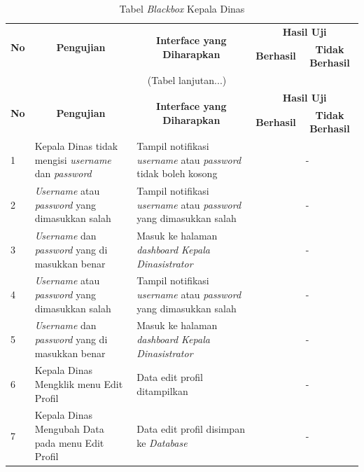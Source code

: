 \begin{enumerate}
{		\begin{longtable}{p{0.5cm} p{4cm} p{5cm} p{0.5cm} p{1cm}}
			\caption{Tabel \textit{Blackbox} Kepala Dinas}
			\label{blackboxtesting2}\\ 
			\hline
			\multicolumn{1}{c}{\multirow{2}{*}{\textbf{No}}} & \multicolumn{1}{c}{\multirow{2}{*}{\textbf{Pengujian}}} & \multicolumn{1}{c}{\multirow{2}{*}{\textbf{Interface yang Diharapkan}}} & \multicolumn{2}{c}{\textbf{Hasil Uji}} \\ \cline{4-5} 
			\multicolumn{1}{c}{} & \multicolumn{1}{c}{} & \multicolumn{1}{c}{} & \multicolumn{1}{c}{\textbf{Berhasil}} & \multicolumn{1}{c}{\textbf{Tidak Berhasil}} \\ \hline
			\endfirsthead
			\multicolumn{5}{c}{\tablename\ \thetable\ \namaTabel \space (Tabel
				lanjutan...)} \\
			\hline
			\multicolumn{1}{c}{\multirow{2}{*}{\textbf{No}}} & \multicolumn{1}{c}{\multirow{2}{*}{\textbf{Pengujian}}} & \multicolumn{1}{c}{\multirow{2}{*}{\textbf{Interface yang Diharapkan}}} & \multicolumn{2}{c}{\textbf{Hasil Uji}} \\ \cline{4-5} 
			\multicolumn{1}{c}{} & \multicolumn{1}{c}{} & \multicolumn{1}{c}{} & \multicolumn{1}{c}{\textbf{Berhasil}} & \multicolumn{1}{c}{\textbf{Tidak Berhasil}} \\ \hline
			\endhead
			1 & Kepala Dinas tidak mengisi \textit{username} dan \textit{password} & Tampil notifikasi \textit{username} atau \textit{password} tidak boleh kosong & \checkmark & -\\
			2 & \textit{Username} atau \textit{password} yang dimasukkan salah & Tampil notifikasi \textit{username} atau \textit{password} yang dimasukkan salah & \checkmark & -\\
			3 & \textit{Username} dan \textit{password} yang di masukkan benar & Masuk ke halaman \textit{dashboard Kepala Dinasistrator} & \checkmark & -\\
			4 & \textit{Username} atau \textit{password} yang dimasukkan salah & Tampil notifikasi \textit{username} atau \textit{password} yang dimasukkan salah & \checkmark & -\\
			5 & \textit{Username} dan \textit{password} yang di masukkan benar & Masuk ke halaman \textit{dashboard Kepala Dinasistrator} & \checkmark & -\\
			6 & Kepala Dinas Mengklik menu Edit Profil  & Data edit profil ditampilkan & \checkmark & -\\
			7 & Kepala Dinas Mengubah Data pada  menu Edit Profil  & Data edit profil disimpan ke \textit{Database} & \checkmark & -\\

\end{longtable}}
\end{enumerate}
